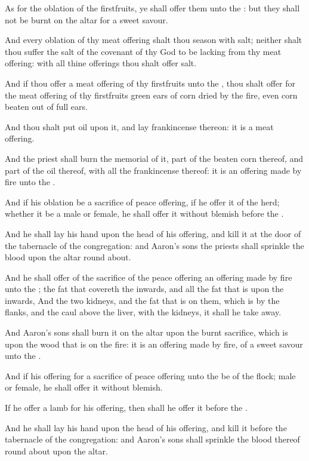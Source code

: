 \Verse As for the oblation of the firstfruits, ye shall offer them unto the \LORD: but they shall not be burnt on the altar for a sweet savour.

\Verse And every oblation of thy meat offering shalt thou season with salt; neither shalt thou suffer the salt of the covenant of thy God to be lacking from thy meat offering: with all thine offerings thou shalt offer salt.

\Verse And if thou offer a meat offering of thy firstfruits unto the \LORD, thou shalt offer for the meat offering of thy firstfruits green ears of corn dried by the fire, even corn beaten out of full ears.

\Verse And thou shalt put oil upon it, and lay frankincense thereon: it is a meat offering.

\Verse And the priest shall burn the memorial of it, part of the beaten corn thereof, and part of the oil thereof, with all the frankincense thereof: it is an offering made by fire unto the \LORD.

\Chapter
\Verse And if his oblation be a sacrifice of peace offering, if he offer it of the herd; whether it be a male or female, he shall offer it without blemish before the \LORD.

\Verse And he shall lay his hand upon the head of his offering, and kill it at the door of the tabernacle of the congregation: and Aaron's sons the priests shall sprinkle the blood upon the altar round about.

\Verse And he shall offer of the sacrifice of the peace offering an offering made by fire unto the \LORD; the fat that covereth the inwards, and all the fat that is upon the inwards, \Verse And the two kidneys, and the fat that is on them, which is by the flanks, and the caul above the liver, with the kidneys, it shall he take away.

\Verse And Aaron's sons shall burn it on the altar upon the burnt sacrifice, which is upon the wood that is on the fire: it is an offering made by fire, of a sweet savour unto the \LORD.

\Verse And if his offering for a sacrifice of peace offering unto the \LORD be of the flock; male or female, he shall offer it without blemish.

\Verse If he offer a lamb for his offering, then shall he offer it before the \LORD.

\Verse And he shall lay his hand upon the head of his offering, and kill it before the tabernacle of the congregation: and Aaron's sons shall sprinkle the blood thereof round about upon the altar.

